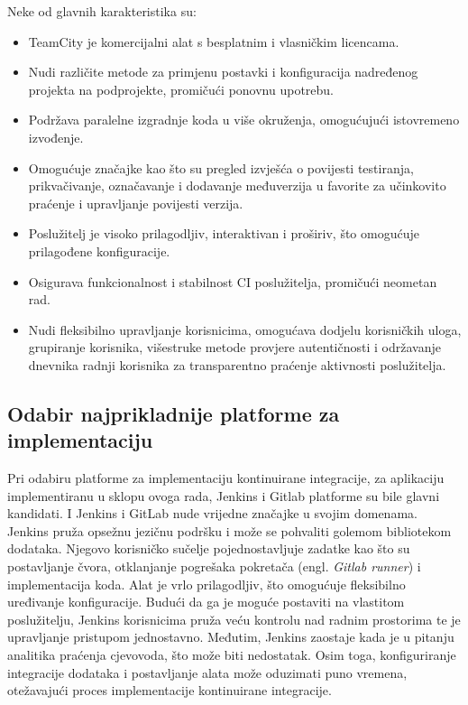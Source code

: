 \documentclass[a4paper,12pt,oneside]{article}
\begin{document}
\begin{enumerate}
Neke od glavnih karakteristika su:
\begin{itemize}
\item TeamCity je komercijalni alat s besplatnim i vlasničkim licencama.
\item Nudi različite metode za primjenu postavki i konfiguracija nadređenog projekta na podprojekte, promičući ponovnu upotrebu.
\item Podržava paralelne izgradnje koda u više okruženja, omogućujući istovremeno izvođenje.
\item Omogućuje značajke kao što su pregled izvješća o povijesti testiranja, prikvačivanje, označavanje i dodavanje međuverzija u favorite za učinkovito praćenje i upravljanje povijesti verzija.
\item Poslužitelj je visoko prilagodljiv, interaktivan i proširiv, što omogućuje prilagođene konfiguracije.
\item Osigurava funkcionalnost i stabilnost CI poslužitelja, promičući neometan rad.
\item Nudi fleksibilno upravljanje korisnicima, omogućava dodjelu korisničkih uloga, grupiranje korisnika, višestruke metode provjere autentičnosti i održavanje dnevnika radnji korisnika za transparentno praćenje aktivnosti poslužitelja.
\end{itemize}

\end{enumerate}

\subsection{Odabir najprikladnije platforme za implementaciju}

Pri odabiru platforme za implementaciju kontinuirane integracije, za aplikaciju implementiranu u sklopu ovoga rada, Jenkins i Gitlab platforme su bile glavni kandidati. I Jenkins i GitLab nude vrijedne značajke u svojim domenama. Jenkins pruža opsežnu jezičnu podršku i može se pohvaliti golemom bibliotekom dodataka. Njegovo korisničko sučelje pojednostavljuje zadatke kao što su postavljanje čvora, otklanjanje pogrešaka pokretača (engl. \textit{Gitlab runner}) i implementacija koda. Alat je vrlo prilagodljiv, što omogućuje fleksibilno uređivanje konfiguracije. Budući da ga je moguće postaviti na vlastitom poslužitelju, Jenkins korisnicima pruža veću kontrolu nad radnim prostorima te je upravljanje pristupom jednostavno.
Međutim, Jenkins zaostaje kada je u pitanju analitika praćenja cjevovoda, što može biti nedostatak. Osim toga, konfiguriranje integracije dodataka i postavljanje alata može oduzimati puno vremena, otežavajući proces implementacije kontinuirane integracije.
\end{document}
